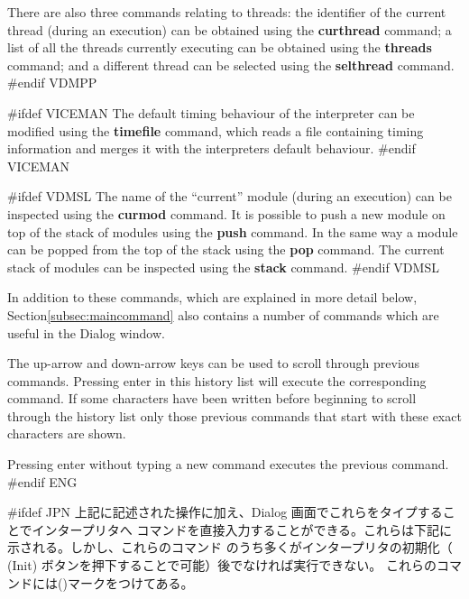 \documentclass[\pformat,12pt]{article}
\newcommand{\guicmd}[1]{{\sf #1}}
\newcommand{\guicmd}[1]{{\gt #1}}
\begin{document}
There are also three commands relating to threads: the identifier of
the current thread (during an execution) can be obtained using the
\textbf{curthread} command; a list of all
the threads currently executing can be obtained using the
\textbf{threads} command; and a 
different thread can be selected using the \textbf{selthread}
command.
#endif VDMPP

#ifdef VICEMAN
The default timing behaviour of the interpreter can be modified using
the \textbf{timefile} command, which reads a file containing timing
information and merges it with the interpreters default behaviour.
#endif VICEMAN

#ifdef VDMSL
The name of the ``current'' module (during an execution) can be
inspected using the \textbf{curmod} command. It is possible to push a 
new module on top of the stack of modules using the \textbf{push}
command. In the same way a module can be popped from the top of the
stack using the \textbf{pop} command. The current stack of modules can
be inspected using the \textbf{stack} command.
#endif VDMSL

In addition to these commands, which are explained in more detail below,
Section\ref{subsec:maincommand} also contains a number of commands
which are useful in the \guicmd{Dialog} window.

The up-arrow and down-arrow keys can be used to scroll through
previous commands. Pressing enter in this history list will execute
the corresponding command.  If some characters have been written
before beginning to scroll through the history list only those
previous commands that start with these exact characters are shown.

Pressing enter without typing a new command executes the previous
command.
#endif ENG

#ifdef JPN
上記に記述された操作に加え、\guicmd{Dialog} 画面でこれらをタイプすることでインタープリタへ
コマンドを直接入力することができる。これらは下記に示される。しかし、これらのコマンド
のうち多くがインタープリタの初期化（
(\guicmd{Init}) ボタンを押下することで可能）後でなければ実行できない。
これらのコマンドには({\tt *})マークをつけてある。
\end{document}
